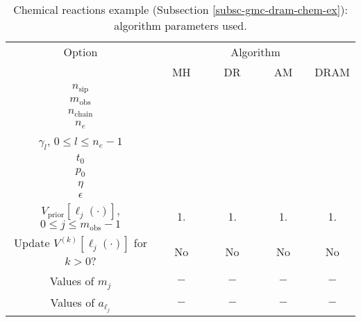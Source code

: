 \begin{table}[h!]
\begin{center}
\begin{tabular}{|c|c|c|c|c|}
\hline
Option                                            & \multicolumn{4}{c|}{Algorithm}                               \\
\cline{2-5}
                                                  & ~~MH~~            & ~~DR~~       & ~~AM~~       & DRAM       \\
\hline
\hline
$n_{\text{sip}}$                                  &                   &              &              &            \\
\hline
$m_{\text{obs}}$                                  &                   &              &              &            \\
\hline
$n_{\text{chain}}$                                &                   &              &              &            \\
\hline
\hline
$n_e$                                             &                   &              &              &            \\
\hline
$\gamma_l$,
$0\leqslant l\leqslant n_e-1$                     &                   &              &              &            \\
\hline
\hline
$t_0$                                             &                   &              &              &            \\
\hline
$p_0$                                             &                   &              &              &            \\
\hline
$\eta$                                            &                   &              &              &            \\
\hline
$\epsilon$                                        &                   &              &              &            \\
\hline
\hline
$V_{\text{prior}}[\ell_j(\cdot)]$,
$0\leqslant j\leqslant m_{\text{obs}}-1$          & 1.                & 1.           & 1.           & 1.         \\
\hline
Update $V^{(k)}[\ell_j(\cdot)]$ for $k>0$?        & No                & No           & No           & No         \\
\hline
Values of $m_j$                                   & $-$               & $-$          & $-$          & $-$        \\
\hline
Values of $a_{\ell_j}$                            & $-$               & $-$          & $-$          & $-$        \\
\hline
\end{tabular}
\caption{Chemical reactions example (Subsection \ref{subsc-gmc-dram-chem-ex}):
algorithm parameters used.
}
\label{tab-dram-chem-ex-alg-params}
\end{center}
\end{table}

